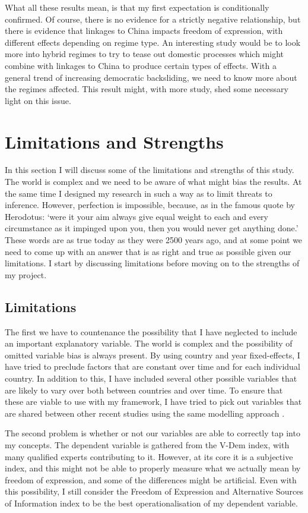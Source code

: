 What all these results mean, is that my first expectation is conditionally confirmed. Of course, there is no evidence for a strictly negative relationship, but there is evidence that linkages to China impacts freedom of expression, with different effects depending on regime type. An interesting study would be to look more into hybrid regimes to try to tease out domestic processes which might combine with linkages to China to produce certain types of effects. With a general trend of increasing democratic backsliding, we need to know more about the regimes affected. This result might, with more study, shed some necessary light on this issue.

\section{Limitations and Strengths}
In this section I will discuss some of the limitations and strengths of this study. The world is complex and we need to be aware of what might bias the results. At the same time I designed my research in such a way as to limit threats to inference. However, perfection is impossible, because, as in the famous quote by Herodotus: `were it your aim always give equal weight to each and every circumstance as it impinged upon you, then you would never get anything done.' These words are as true today as they were 2500 years ago, and at some point we need to come up with an answer that is as right and true as possible given our limitations. I start by discussing limitations before moving on to the strengths of my project.

\subsection{Limitations}
The first we have to countenance the possibility that I have neglected to include an important explanatory variable. The world is complex and the possibility of omitted variable bias is always present. By using country and year fixed-effects, I have tried to preclude factors that are constant over time and for each individual country. In addition to this, I have included several other possible variables that are likely to vary over both between countries and over time. To ensure that these are viable to use with my framework, I have tried to pick out variables that are shared between other recent studies using the same modelling approach \citep{gamso_is_2021, toettoe_foreign_2023}.

The second problem is whether or not our variables are able to correctly tap into my concepts. The dependent variable is gathered from the V-Dem index, with many qualified experts contributing to it. However, at its core it is a subjective index, and this might not be able to properly measure what we actually mean by freedom of expression, and some of the differences might be artificial. Even with this possibility, I still consider the Freedom of Expression and Alternative Sources of Information index to be the best operationalisation of my dependent variable.

